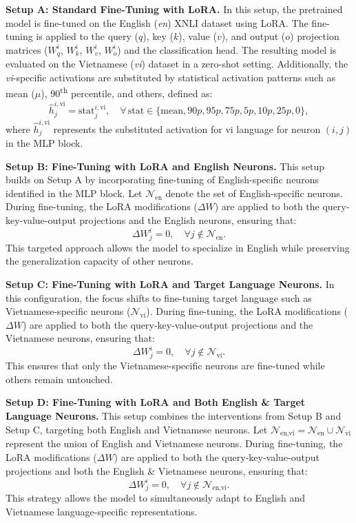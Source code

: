 \textbf{Setup A: Standard Fine-Tuning with LoRA.} In this setup, the pretrained model is fine-tuned on the English (\textit{en}) XNLI dataset using LoRA. The fine-tuning is applied to the query (\(q\)), key (\(k\)), value (\(v\)), and output (\(o\)) projection matrices (\(W_q^i\), \(W_k^i\), \(W_v^i\), \(W_o^i\)) and the classification head. The resulting model is evaluated on the Vietnamese (\textit{vi}) dataset in a zero-shot setting. Additionally, the \textit{vi}-specific activations are substituted by statistical activation patterns such as mean (\(\mu\)), 90\textsuperscript{th} percentile, and others, defined as:
\begin{equation}
	\hat{h}_{j}^{i,\text{vi}} = \text{stat}_{j}^{i,\text{vi}}, \quad \forall \, \text{stat} \in \{\text{mean}, 90p, 95p, 75p, 5p, 10p, 25p, 0\},
\end{equation}
where \(\hat{h}_{j}^{i,\text{vi}}\) represents the substituted activation for vi language for neuron \((i,j)\) in the MLP block.

\textbf{Setup B: Fine-Tuning with LoRA and English Neurons.} This setup builds on Setup A by incorporating fine-tuning of English-specific neurons identified in the MLP block. Let \(\mathcal{N}_\text{en}\) denote the set of English-specific neurons. During fine-tuning, the LoRA modifications (\(\Delta W\)) are applied to both the query-key-value-output projections and the English neurons, ensuring that:
\begin{equation}
	\Delta W_{j}^{i} = 0, \quad \forall j \notin \mathcal{N}_\text{en}.
\end{equation}
This targeted approach allows the model to specialize in English while preserving the generalization capacity of other neurons.

\textbf{Setup C: Fine-Tuning with LoRA and Target Language Neurons.} In this configuration, the focus shifts to fine-tuning target language such as Vietnamese-specific neurons (\(\mathcal{N}_\text{vi}\)). During fine-tuning, the LoRA modifications (\(\Delta W\)) are applied to both the query-key-value-output projections and the Vietnamese neurons, ensuring that:
\begin{equation}
	\Delta W_{j}^{i} = 0, \quad \forall j \notin \mathcal{N}_\text{vi}.
\end{equation}
This ensures that only the Vietnamese-specific neurons are fine-tuned while others remain untouched.

\textbf{Setup D: Fine-Tuning with LoRA and Both English \& Target Language Neurons.} This setup combines the interventions from Setup B and Setup C, targeting both English and Vietnamese neurons. Let \(\mathcal{N}_\text{en,vi} = \mathcal{N}_\text{en} \cup \mathcal{N}_\text{vi}\) represent the union of English and Vietnamese neurons. During fine-tuning, the LoRA modifications (\(\Delta W\)) are applied to both the query-key-value-output projections and both the English \& Vietnamese neurons, ensuring that:
\begin{equation}
	\Delta W_{j}^{i} = 0, \quad \forall j \notin \mathcal{N}_\text{en,vi}.
\end{equation}
This strategy allows the model to simultaneously adapt to English and Vietnamese language-specific representations.


